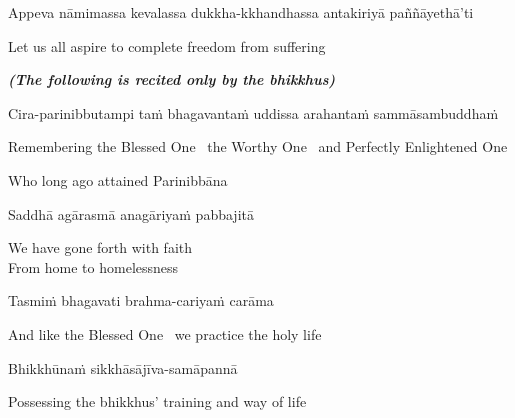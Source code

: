 \begin{pali-hang}
  Appeva nāmimassa kevalassa dukkha-kkhandhassa antakiriyā paññāyethā'ti
\end{pali-hang}

\begin{english}
  Let us all aspire to complete freedom from suffering
\end{english}

\clearpage

\begin{center}
  \textit{\textbf{(The following is recited only by the bhikkhus)}}
\end{center}

\begin{pali-hang}
  Cira-parinibbutampi taṁ bhagavantaṁ uddissa arahantaṁ sammāsambuddhaṁ
\end{pali-hang}

\begin{english-hang}
  Remembering the Blessed One \breathmark\ the Worthy One \breathmark\ and Perfectly Enlightened One\\
\end{english-hang}

\begin{english}
  Who long ago attained Parinibbāna
\end{english}

Saddhā agārasmā anagāriyaṁ pabbajitā

\begin{english}
  We have gone forth with faith\\
  From home to homelessness
\end{english}

Tasmiṁ bhagavati brahma-cariyaṁ carāma

\begin{english}
  And like the Blessed One \breathmark\ we practice the holy life
\end{english}

Bhikkhūnaṁ sikkhāsājīva-samāpannā

\begin{english}
    Possessing the bhikkhus' training and way of life\makeatletter\hyperlink{endnote28-appendix}\makeatother
\end{english}

